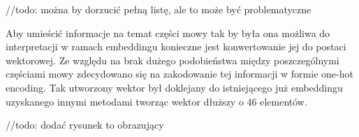 //todo: można by dorzucić pełną listę, ale to może być problematyczne 
 

Aby umieścić informacje na temat części mowy tak by była ona możliwa do interpretacji w ramach embeddingu konieczne jest konwertowanie jej do postaci wektorowej. Ze względu na brak dużego podobieństwa między poszczególnymi częściami mowy zdecydowano się na zakodowanie tej informacji w formie one-hot encoding. Tak utworzony wektor był doklejany do istniejącego już embeddingu uzyskanego innymi metodami tworząc wektor dłuższy o 46 elementów. 

//todo: dodać rysunek to obrazujący